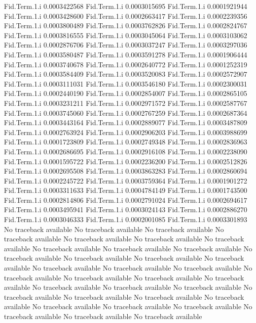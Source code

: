 \documentclass[11pt]{article} %
\begin{document}
\begin{Schunk}
\begin{Soutput}
Fid.Term.1.i 0.0003422568
Fid.Term.1.i 0.0003015695
Fid.Term.1.i 0.0001921944
Fid.Term.1.i 0.0003428600
Fid.Term.1.i 0.0002663417
Fid.Term.1.i 0.0002239356
Fid.Term.1.i 0.0003800489
Fid.Term.1.i 0.0003762826
Fid.Term.1.i 0.0002824767
Fid.Term.1.i 0.0003816555
Fid.Term.1.i 0.0003045064
Fid.Term.1.i 0.0003103062
Fid.Term.1.i 0.0002876706
Fid.Term.1.i 0.0003037247
Fid.Term.1.i 0.0003297036
Fid.Term.1.i 0.0003580487
Fid.Term.1.i 0.0003591278
Fid.Term.1.i 0.0001906444
Fid.Term.1.i 0.0003740678
Fid.Term.1.i 0.0002640772
Fid.Term.1.i 0.0001252319
Fid.Term.1.i 0.0003584409
Fid.Term.1.i 0.0003520083
Fid.Term.1.i 0.0002572907
Fid.Term.1.i 0.0003111031
Fid.Term.1.i 0.0003546180
Fid.Term.1.i 0.0002300031
Fid.Term.1.i 0.0002440190
Fid.Term.1.i 0.0002854007
Fid.Term.1.i 0.0002865105
Fid.Term.1.i 0.0003231211
Fid.Term.1.i 0.0002971572
Fid.Term.1.i 0.0002587767
Fid.Term.1.i 0.0003745060
Fid.Term.1.i 0.0002767259
Fid.Term.1.i 0.0002687364
Fid.Term.1.i 0.0003443164
Fid.Term.1.i 0.0002889077
Fid.Term.1.i 0.0003487809
Fid.Term.1.i 0.0002763924
Fid.Term.1.i 0.0002906203
Fid.Term.1.i 0.0003988699
Fid.Term.1.i 0.0001723809
Fid.Term.1.i 0.0002749348
Fid.Term.1.i 0.0002836963
Fid.Term.1.i 0.0002686695
Fid.Term.1.i 0.0002916108
Fid.Term.1.i 0.0002238090
Fid.Term.1.i 0.0001595722
Fid.Term.1.i 0.0002236200
Fid.Term.1.i 0.0002512826
Fid.Term.1.i 0.0002695508
Fid.Term.1.i 0.0003863283
Fid.Term.1.i 0.0002860694
Fid.Term.1.i 0.0002245722
Fid.Term.1.i 0.0003759364
Fid.Term.1.i 0.0001901272
Fid.Term.1.i 0.0003311633
Fid.Term.1.i 0.0004784149
Fid.Term.1.i 0.0001743500
Fid.Term.1.i 0.0002814806
Fid.Term.1.i 0.0002791024
Fid.Term.1.i 0.0002694617
Fid.Term.1.i 0.0003495941
Fid.Term.1.i 0.0003024143
Fid.Term.1.i 0.0002886270
Fid.Term.1.i 0.0003046333
Fid.Term.1.i 0.0002001085
Fid.Term.1.i 0.0003301893
No traceback available 
No traceback available 
No traceback available 
No traceback available 
No traceback available 
No traceback available 
No traceback available 
No traceback available 
No traceback available 
No traceback available 
No traceback available 
No traceback available 
No traceback available 
No traceback available 
No traceback available 
No traceback available 
No traceback available 
No traceback available 
No traceback available 
No traceback available 
No traceback available 
No traceback available 
No traceback available 
No traceback available 
No traceback available 
No traceback available 
No traceback available 
No traceback available 
No traceback available 
No traceback available 
No traceback available 
No traceback available 
No traceback available 
No traceback available 

\end{Soutput}
\end{Schunk}
\end{document}
